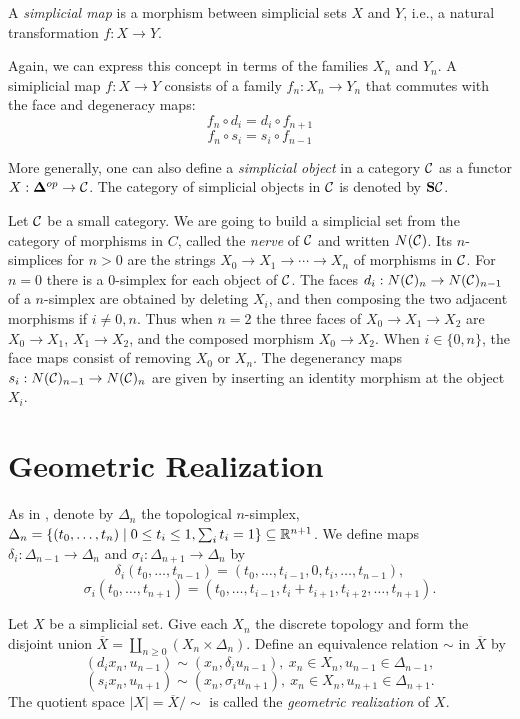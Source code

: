\documentclass[TFM.tex]{subfiles}
\begin{document}
\begin{defi}
A \emph{simplicial map} is a morphism between simplicial sets $X$ and $Y$, i.e., a natural transformation $f: X\to Y$.
\end{defi}

Again, we can express this concept in terms of the families $X_n$ and $Y_n$. A simiplicial map $f:X\to Y$ consists of a family $f_n:X_n\to Y_n$ that commutes with the face and degeneracy maps:
\[f_n\circ d_i=d_i\circ f_{n+1}\]
\[f_n\circ s_i=s_i\circ f_{n-1}\]

More generally, one can also define a \emph{simplicial object} in a category $\mathcal{C}$ as a functor $X:\mathbf{\Delta}^{op}\to\mathcal{C}$. The category of simplicial objects in $\mathcal{C}$ is denoted by $\mathrm{\mathbf{S}\mathcal{C}}$. 
\begin{ex}
Let $\mathcal{C}$ be a small category. We are going to build a simplicial set from the category of morphisms in $C$, called the \emph{nerve} of $\mathcal{C}$ and written $N(\mathcal{C})$. Its $n$-simplices for $n>0$ are the strings $X_0→X_1→\cdots →X_n$ of morphisms in $\mathcal{C}$. For $n=0$ there is a $0$-simplex for each object of $\mathcal{C}$. The faces $d_i:N(\mathcal{C})_n\to N(\mathcal{C})_{n-1}$ of a $n$-simplex are obtained by deleting $X_i$, and then composing the two adjacent morphisms if $i ≠ 0,n$. Thus when $n = 2$ the three faces of
$X_0→X_1→X_2$ are $X_0→X_1$, $X_1→X_2$, and the composed morphism $X_0→X_2$. When $i\in \{0,n\}$, the face maps consist of removing $X_0$ or $X_n$.
The degenerancy maps $s_i:N(\mathcal{C})_{n-1}\to N(\mathcal{C})_n$ are given by inserting an identity morphism at the object $X_i$. 

\end{ex}




\section{Geometric Realization}

As in \cite[Chapter III]{simplicial}, denote by $\Delta_n$ the topological $n$-simplex, $\Delta_n=\{(t_0,\dots, t_n)\mid 0\leq t_i\leq 1, \sum_i t_i=1\}\subseteq\mathbb{R}^{n+1}$. We define maps $\delta_i:\Delta_{n-1}\to\Delta_n$ and $\sigma_i:\Delta_{n+1}\to\Delta_n$ by
\[
\delta_i(t_0,\dots, t_{n-1})=(t_0,\dots, t_{i-1},0,t_i,\dots, t_{n-1}),
\]
\[\sigma_i(t_0,\dots, t_{n+1})=(t_0,\dots, t_{i-1},t_i+t_{i+1},t_{i+2},\dots, t_{n+1}).\]

Let $X$ be a simplicial set. Give each $X_n$ the discrete topology and form the disjoint union $\overline{X}=\coprod_{n\geq 0}(X_n\times\Delta_n)$. Define an equivalence relation $\sim$ in $\overline{X}$ by
\[(d_ix_n,u_{n-1})\sim(x_n,\delta_i u_{n-1}),\ x_n\in X_n, u_{n-1}\in\Delta_{n-1},\]
\[(s_ix_n,u_{n+1})\sim(x_n,\sigma_iu_{n+1}),\ x_n\in X_n, u_{n+1}\in\Delta_{n+1}.\]
The quotient space $|X|=\overline{X}/\sim$ is called the \emph{geometric realization} of $X$. %
\end{document}
